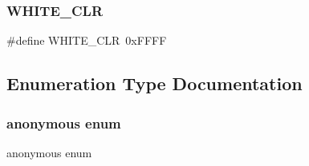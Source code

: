 \hypertarget{group___checkers_ga455c619153ef283f338157e6b2156179}{}\label{group___checkers_ga455c619153ef283f338157e6b2156179} 
\subsubsection{\texorpdfstring{W\+H\+I\+T\+E\+\_\+\+C\+LR}{WHITE\_CLR}}
{\footnotesize\ttfamily \#define W\+H\+I\+T\+E\+\_\+\+C\+LR~0x\+F\+F\+FF}



\subsection{Enumeration Type Documentation}
\hypertarget{group___checkers_ga06fc87d81c62e9abb8790b6e5713c55b}{}\label{group___checkers_ga06fc87d81c62e9abb8790b6e5713c55b} 
\subsubsection{\texorpdfstring{anonymous enum}{anonymous enum}}
{\footnotesize\ttfamily anonymous enum}

